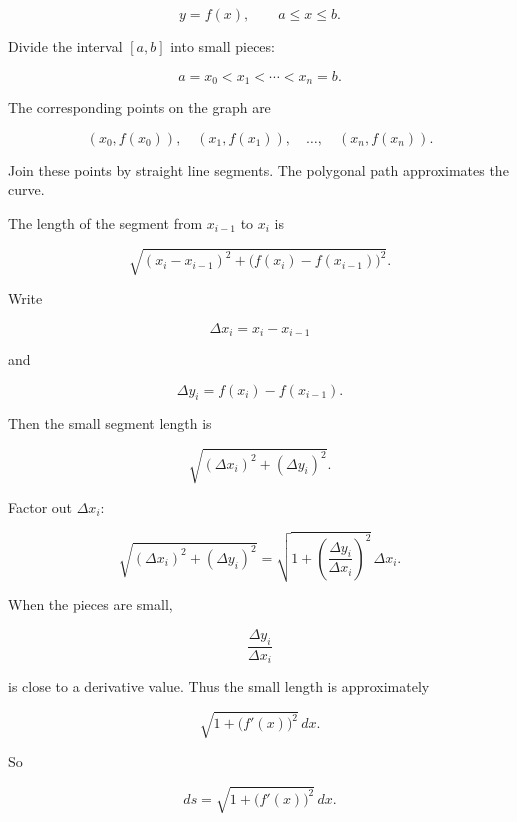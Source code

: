 \[
y=f(x),
\qquad a\le x\le b.
\]

Divide the interval \([a,b]\) into small pieces:

\[
a=x_0<x_1<\cdots<x_n=b.
\]

The corresponding points on the graph are

\[
(x_0,f(x_0)),\quad (x_1,f(x_1)),\quad \ldots,\quad (x_n,f(x_n)).
\]

Join these points by straight line segments.  The polygonal path approximates the curve.

The length of the segment from \(x_{i-1}\) to \(x_i\) is

\[
\sqrt{(x_i-x_{i-1})^2+\bigl(f(x_i)-f(x_{i-1})\bigr)^2}.
\]

Write

\[
\Delta x_i=x_i-x_{i-1}
\]

and

\[
\Delta y_i=f(x_i)-f(x_{i-1}).
\]

Then the small segment length is

\[
\sqrt{(\Delta x_i)^2+(\Delta y_i)^2}.
\]

Factor out \(\Delta x_i\):

\[
\sqrt{(\Delta x_i)^2+(\Delta y_i)^2}
=
\sqrt{1+\left(\frac{\Delta y_i}{\Delta x_i}\right)^2}\,\Delta x_i.
\]

When the pieces are small,

\[
\frac{\Delta y_i}{\Delta x_i}
\]

is close to a derivative value.  Thus the small length is approximately

\[
\sqrt{1+\bigl(f'(x)\bigr)^2}\,dx.
\]

So

\[
\boxed{
ds=\sqrt{1+\bigl(f'(x)\bigr)^2}\,dx.
}
\]

